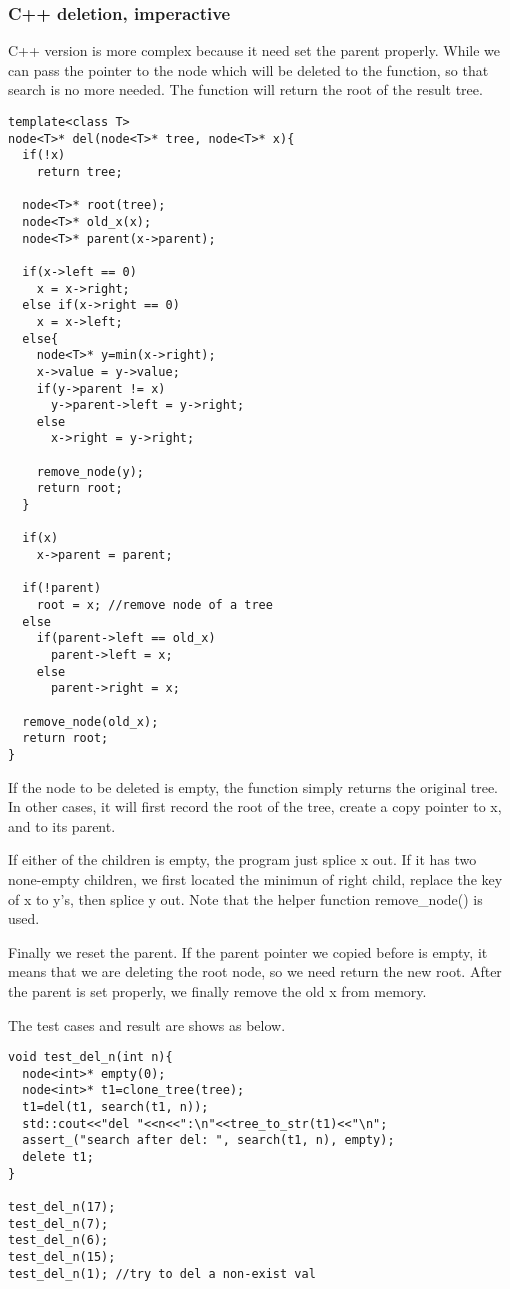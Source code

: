 \documentclass{article}
\begin{document}
\subsubsection*{C++ deletion, imperactive}

C++ version is more complex because it need set the parent properly.
While we can pass the pointer to the node which will be deleted to the function,
so that search is no more needed. The function will return the root
of the result tree.

\lstset{language=C++}
\begin{lstlisting}
template<class T>
node<T>* del(node<T>* tree, node<T>* x){
  if(!x)
    return tree;

  node<T>* root(tree);
  node<T>* old_x(x);
  node<T>* parent(x->parent);

  if(x->left == 0)
    x = x->right;
  else if(x->right == 0)
    x = x->left;
  else{
    node<T>* y=min(x->right);
    x->value = y->value;
    if(y->parent != x)
      y->parent->left = y->right;
    else
      x->right = y->right;

    remove_node(y);
    return root;
  }

  if(x)
    x->parent = parent;

  if(!parent)
    root = x; //remove node of a tree
  else
    if(parent->left == old_x)
      parent->left = x;
    else
      parent->right = x;

  remove_node(old_x);
  return root;
}
\end{lstlisting}

If the node to be deleted is empty, the function simply returns the original tree.
In other cases, it will first record the root of the tree, create a copy pointer
to x, and to its parent.

If either of the children is empty, the program just splice x out. If it has two
none-empty children, we first located the minimun of right child, replace the key
of x to y's, then splice y out. Note that the helper function remove\_node() is
used.

Finally we reset the parent. If the parent pointer we copied before is empty, it
means that we are deleting the root node, so we need return the new root. After
the parent is set properly, we finally remove the old x from memory.

The test cases and result are shows as below.

\begin{lstlisting}
void test_del_n(int n){
  node<int>* empty(0);
  node<int>* t1=clone_tree(tree);
  t1=del(t1, search(t1, n));
  std::cout<<"del "<<n<<":\n"<<tree_to_str(t1)<<"\n";
  assert_("search after del: ", search(t1, n), empty);
  delete t1;
}

test_del_n(17);
test_del_n(7);
test_del_n(6);
test_del_n(15);
test_del_n(1); //try to del a non-exist val
\end{lstlisting}
\end{document}
